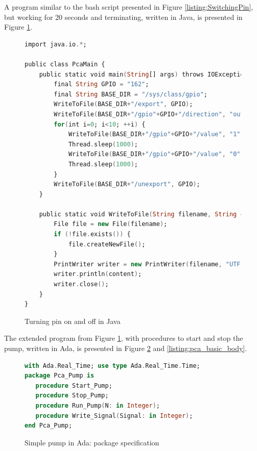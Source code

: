 A program similar to the bash script presented in Figure \ref{listing:SwitchingPin}, but working for 20 seconds and terminating, written in Java, is presented in Figure \ref{listing:pca_java}. 

\begin{figure}[ht]
\singlespacing
\begin{lstlisting}[language=ada, frame=single, gobble=0]
import java.io.*;

public class PcaMain {
	public static void main(String[] args) throws IOException, InterruptedException {
		final String GPIO = "162";
		final String BASE_DIR = "/sys/class/gpio";			
		WriteToFile(BASE_DIR+"/export", GPIO);
		WriteToFile(BASE_DIR+"/gpio"+GPIO+"/direction", "out");			
		for(int i=0; i<10; ++i) {
            WriteToFile(BASE_DIR+"/gpio"+GPIO+"/value", "1");
            Thread.sleep(1000);
			WriteToFile(BASE_DIR+"/gpio"+GPIO+"/value", "0");
            Thread.sleep(1000);
		}			
		WriteToFile(BASE_DIR+"/unexport", GPIO);
	}
	
	public static void WriteToFile(String filename, String content) throws IOException {
		File file = new File(filename);			 
		if (!file.exists()) {
			file.createNewFile();
		}
		PrintWriter writer = new PrintWriter(filename, "UTF-8");
		writer.println(content);
		writer.close();
	}
}
\end{lstlisting} 
\doublespacing
\caption{Turning pin on and off in Java}
\label{listing:pca_java}
\end{figure}

The extended program from Figure \ref{listing:pca_java}, with procedures to start and stop the pump, written in Ada, is presented in Figure \ref{listing:pca_basic_spec} and \ref{listing:pca_basic_body}.

\begin{figure}[ht]
\singlespacing
\begin{lstlisting}[language=ada, frame=single, gobble=0]
with Ada.Real_Time; use type Ada.Real_Time.Time;
package Pca_Pump is   
   procedure Start_Pump;
   procedure Stop_Pump;
   procedure Run_Pump(N: in Integer);
   procedure Write_Signal(Signal: in Integer);
end Pca_Pump;
\end{lstlisting}
\doublespacing
\caption{Simple pump in Ada: package specification}
\label{listing:pca_basic_spec}
\end{figure}

